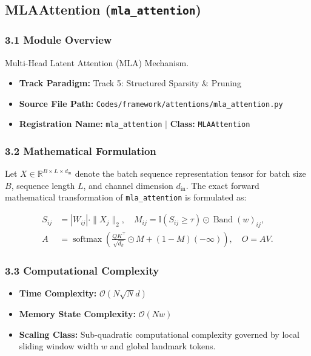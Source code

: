 \subsection{MLAAttention (\texttt{mla\_attention})}
\label{sec:app_module_mla_attention}

\subsubsection*{3.1 Module Overview}
Multi-Head Latent Attention (MLA) Mechanism.
\begin{itemize}
    \item \textbf{Track Paradigm:} Track 5: Structured Sparsity \& Pruning
    \item \textbf{Source File Path:} \texttt{Codes/framework/attentions/mla\_attention.py}
    \item \textbf{Registration Name:} \texttt{mla\_attention} $\mid$ \textbf{Class:} \texttt{MLAAttention}
\end{itemize}

\subsubsection*{3.2 Mathematical Formulation}
Let $X \in \mathbb{R}^{B \times L \times d_{\text{in}}}$ denote the batch sequence representation tensor for batch size $B$, sequence length $L$, and channel dimension $d_{\text{in}}$. The exact forward mathematical transformation of \texttt{mla\_attention} is formulated as:

\begin{align}
S_{ij} &= |W_{ij}| \cdot \|X_j\|_2, \quad M_{ij} = \mathbb{I}(S_{ij} \ge \tau) \odot \operatorname{Band}(w)_{ij}, \\
A &= \operatorname{softmax}\left(\frac{Q K^\top}{\sqrt{d_k}} \odot M + (1 - M)(-\infty)\right), \quad O = A V.
\end{align}


\subsubsection*{3.3 Computational Complexity}
\begin{itemize}
    \item \textbf{Time Complexity:} $\mathcal{O}(N \sqrt{N} d)$
    \item \textbf{Memory State Complexity:} $\mathcal{O}(N w)$
    \item \textbf{Scaling Class:} Sub-quadratic computational complexity governed by local sliding window width $w$ and global landmark tokens.
\end{itemize}

